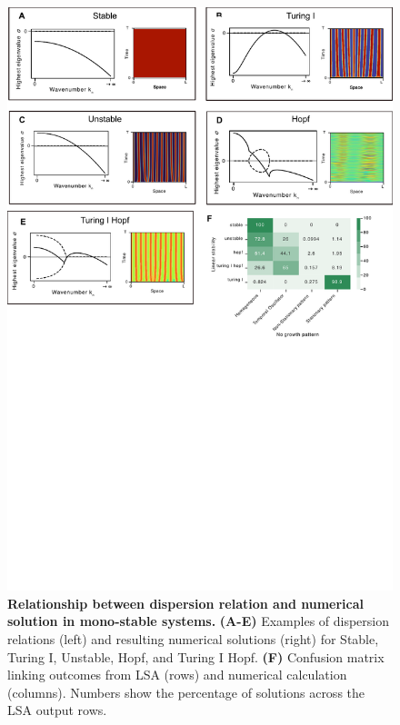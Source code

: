\documentclass[10pt,letterpaper]{article}
\begin{document}
\begin{figure}[H]
    \includegraphics[width=1\textwidth]{figures/dispersion} %
    \caption{\textbf{Relationship between dispersion relation and numerical solution in mono-stable systems.} \textbf{(A-E)} Examples of dispersion relations (left) and resulting numerical solutions (right) for Stable, Turing I, Unstable, Hopf, and Turing I Hopf. \textbf{(F)} Confusion matrix linking outcomes from LSA (rows) and numerical calculation (columns). Numbers show the percentage of solutions across the LSA output rows.}
    \label{fig:dispersions} %
\end{figure}
\end{document}

